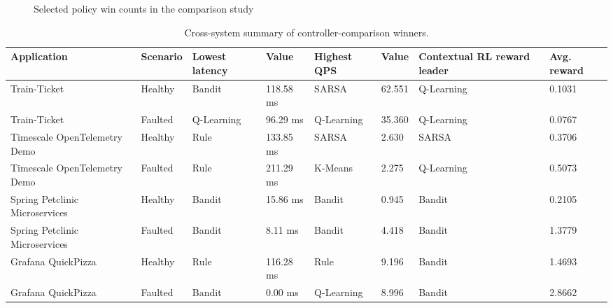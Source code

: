\documentclass[10pt,twocolumn]{article}
\begin{document}
\begin{figure}[t]
\centering
{}
\caption{Selected policy win counts in the comparison study}
\end{figure}


\begin{table}[t]
\centering
\small
\caption{Cross-system summary of controller-comparison winners.}
\begin{tabularx}{\textwidth}{p{2.5cm}p{1.2cm}p{2.0cm}p{1.2cm}p{1.8cm}p{1.1cm}p{2.2cm}p{1.1cm}}
\toprule
Application & Scenario & Lowest latency & Value & Highest QPS & Value & Contextual RL reward leader & Avg. reward \\
\midrule

Train-Ticket & Healthy & Bandit & 118.58 ms & SARSA & 62.551 & Q-Learning & 0.1031 \\
Train-Ticket & Faulted & Q-Learning & 96.29 ms & Q-Learning & 35.360 & Q-Learning & 0.0767 \\
Timescale OpenTelemetry Demo & Healthy & Rule & 133.85 ms & SARSA & 2.630 & SARSA & 0.3706 \\
Timescale OpenTelemetry Demo & Faulted & Rule & 211.29 ms & K-Means & 2.275 & Q-Learning & 0.5073 \\
Spring Petclinic Microservices & Healthy & Bandit & 15.86 ms & Bandit & 0.945 & Bandit & 0.2105 \\
Spring Petclinic Microservices & Faulted & Bandit & 8.11 ms & Bandit & 4.418 & Bandit & 1.3779 \\
Grafana QuickPizza & Healthy & Rule & 116.28 ms & Rule & 9.196 & Bandit & 1.4693 \\
Grafana QuickPizza & Faulted & Bandit & 0.00 ms & Q-Learning & 8.996 & Bandit & 2.8662 \\
\bottomrule
\end{tabularx}
\end{table}
\end{document}
